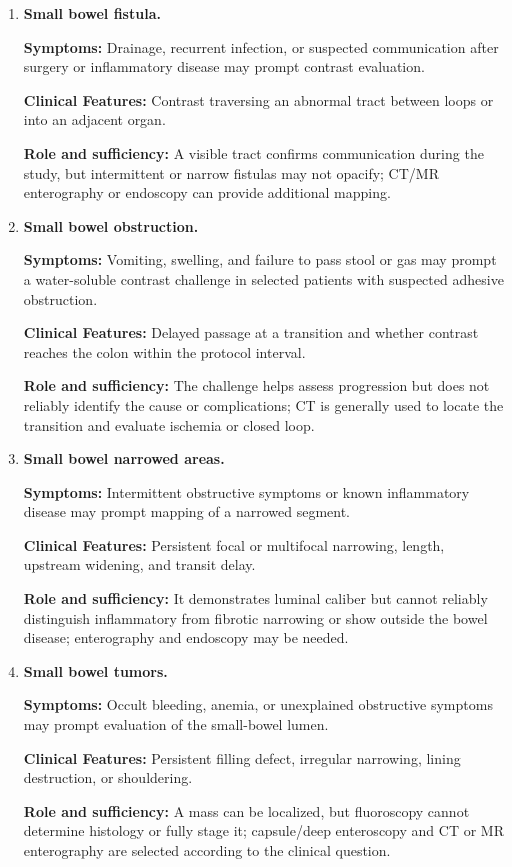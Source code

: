 \begin{enumerate}[leftmargin=*,itemsep=0.45em,topsep=0.4em]
\item \textbf{Small bowel fistula.}\par\noindent\textbf{Symptoms:} Drainage, recurrent infection, or suspected communication after surgery or inflammatory disease may prompt contrast evaluation.\par\noindent\textbf{Clinical Features:} Contrast traversing an abnormal tract between loops or into an adjacent organ.\par\noindent\textbf{Role and sufficiency:} A visible tract confirms communication during the study, but intermittent or narrow fistulas may not opacify; CT/MR enterography or endoscopy can provide additional mapping.
\item \textbf{Small bowel obstruction.}\par\noindent\textbf{Symptoms:} Vomiting, swelling, and failure to pass stool or gas may prompt a water-soluble contrast challenge in selected patients with suspected adhesive obstruction.\par\noindent\textbf{Clinical Features:} Delayed passage at a transition and whether contrast reaches the colon within the protocol interval.\par\noindent\textbf{Role and sufficiency:} The challenge helps assess progression but does not reliably identify the cause or complications; CT is generally used to locate the transition and evaluate ischemia or closed loop.
\item \textbf{Small bowel narrowed areas.}\par\noindent\textbf{Symptoms:} Intermittent obstructive symptoms or known inflammatory disease may prompt mapping of a narrowed segment.\par\noindent\textbf{Clinical Features:} Persistent focal or multifocal narrowing, length, upstream widening, and transit delay.\par\noindent\textbf{Role and sufficiency:} It demonstrates luminal caliber but cannot reliably distinguish inflammatory from fibrotic narrowing or show outside the bowel disease; enterography and endoscopy may be needed.
\item \textbf{Small bowel tumors.}\par\noindent\textbf{Symptoms:} Occult bleeding, anemia, or unexplained obstructive symptoms may prompt evaluation of the small-bowel lumen.\par\noindent\textbf{Clinical Features:} Persistent filling defect, irregular narrowing, lining destruction, or shouldering.\par\noindent\textbf{Role and sufficiency:} A mass can be localized, but fluoroscopy cannot determine histology or fully stage it; capsule/deep enteroscopy and CT or MR enterography are selected according to the clinical question.
\end{enumerate}

